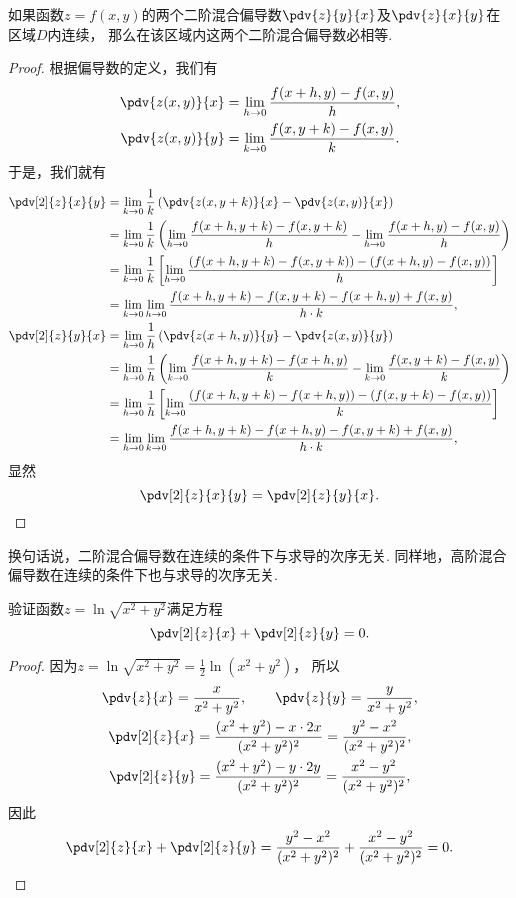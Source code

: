 \begin{theorem}
如果函数\(z=f(x,y)\)的两个二阶混合偏导数\(\pdv{z}{y}{x}\)及\(\pdv{z}{x}{y}\)在区域\(D\)内连续，
那么在该区域内这两个二阶混合偏导数必相等.
\begin{proof}
根据偏导数的定义，我们有\begin{gather*}
	\pdv{z(x,y)}{x}
	= \lim_{h\to0} \frac{f(x+h,y)-f(x,y)}{h}, \\
	\pdv{z(x,y)}{y}
	= \lim_{k\to0} \frac{f(x,y+k)-f(x,y)}{k}.
\end{gather*}
于是，我们就有\begin{align*}
	\pdv[2]{z}{x}{y}
	&= \lim_{k\to0}
		\frac1k \left( \pdv{z(x,y+k)}{x} - \pdv{z(x,y)}{x} \right) \\
	&= \lim_{k\to0}
		\frac1k \left( \lim_{h\to0} \frac{f(x+h,y+k)-f(x,y+k)}{h} - \lim_{h\to0} \frac{f(x+h,y)-f(x,y)}{h} \right) \\
	&= \lim_{k\to0}
		\frac1k \left[ \lim_{h\to0} \frac{(f(x+h,y+k)-f(x,y+k))-(f(x+h,y)-f(x,y))}{h} \right] \\
	&= \lim_{k\to0} \lim_{h\to0}
		\frac{f(x+h,y+k)-f(x,y+k)-f(x+h,y)+f(x,y)}{h \cdot k}, \\
	\pdv[2]{z}{y}{x}
	&= \lim_{h\to0}
		\frac1h \left( \pdv{z(x+h,y)}{y} - \pdv{z(x,y)}{y} \right) \\
	&= \lim_{h\to0}
		\frac1h \left( \lim_{k\to0} \frac{f(x+h,y+k)-f(x+h,y)}{k} - \lim_{k\to0} \frac{f(x,y+k)-f(x,y)}{k} \right) \\
	&= \lim_{h\to0}
		\frac1h \left[ \lim_{k\to0} \frac{(f(x+h,y+k)-f(x+h,y))-(f(x,y+k)-f(x,y))}{k} \right] \\
	&= \lim_{h\to0} \lim_{k\to0}
		\frac{f(x+h,y+k)-f(x+h,y)-f(x,y+k)+f(x,y)}{h \cdot k}, \\
\end{align*}
显然\[
	\pdv[2]{z}{x}{y} = \pdv[2]{z}{y}{x}.
	\qedhere
\]
\end{proof}
\end{theorem}
换句话说，二阶混合偏导数在连续的条件下与求导的次序无关.
同样地，高阶混合偏导数在连续的条件下也与求导的次序无关.

\begin{example}
验证函数\(z = \ln\sqrt{x^2+y^2}\)满足方程\[
	\pdv[2]{z}{x} + \pdv[2]{z}{y} = 0.
\]
\begin{proof}
因为\(z = \ln\sqrt{x^2+y^2} = \frac{1}{2} \ln(x^2+y^2)\)，
所以\begin{gather*}
	\pdv{z}{x} = \frac{x}{x^2+y^2},
	\qquad
	\pdv{z}{y} = \frac{y}{x^2+y^2}, \\
	\pdv[2]{z}{x} = \frac{(x^2+y^2)-x\cdot2x}{(x^2+y^2)^2}
	= \frac{y^2-x^2}{(x^2+y^2)^2}, \\
	\pdv[2]{z}{y} = \frac{(x^2+y^2)-y\cdot2y}{(x^2+y^2)^2}
	= \frac{x^2-y^2}{(x^2+y^2)^2},
\end{gather*}
因此\[
	\pdv[2]{z}{x} + \pdv[2]{z}{y}
	= \frac{y^2-x^2}{(x^2+y^2)^2} + \frac{x^2-y^2}{(x^2+y^2)^2}
	= 0.
	\qedhere
\]
\end{proof}
\end{example}

